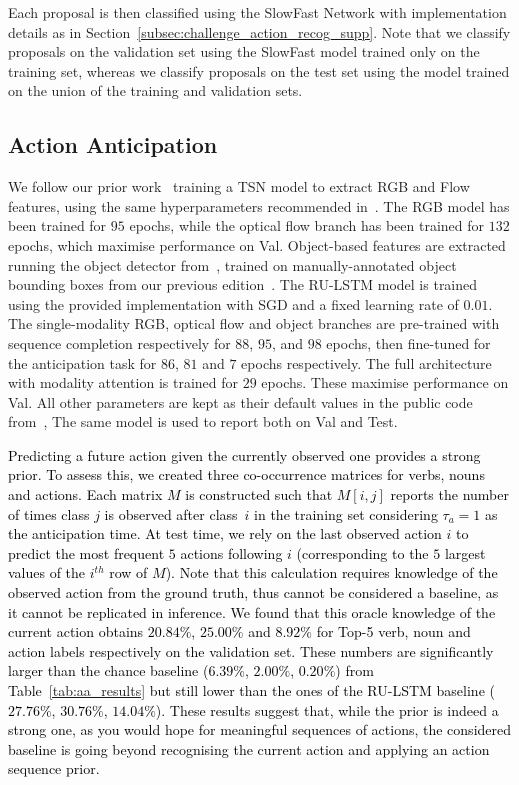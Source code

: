 \documentclass[twocolumn]{svjour3}          \smartqed
\newcommand{\chParagraph}[1]{\noindent {\textbf{#1.}} \hspace{6pt}}
\newcommand{\edits}[1]{\textcolor{black}{#1}}
\begin{document}
Each proposal is then classified using the SlowFast Network with implementation details as in Section~\ref{subsec:challenge_action_recog_supp}. Note that we classify proposals on the validation set using the SlowFast model trained only on the training set, whereas we classify proposals on the test set using the model trained on the union of the training and validation sets.


\subsection{Action Anticipation}


\chParagraph{Implementation and Training Details}
We follow our prior work~\cite{furnari2019would} training a TSN model to extract RGB and Flow features, using the same hyperparameters recommended in~\cite{furnari2019would}.
The RGB model has been trained for $95$ epochs, while the optical flow branch has been trained for $132$ epochs, which maximise performance on Val.
Object-based features are extracted running the object detector from~\cite{furnari2019would}, trained on manually-annotated object bounding boxes from our previous edition~\cite{Damen2018EPICKITCHENS}. 
The RU-LSTM model is trained using the provided implementation with SGD and a fixed learning rate of $0.01$. The single-modality RGB, optical flow and object branches are pre-trained with sequence completion respectively for $88$, $95$, and $98$ epochs, then fine-tuned for the anticipation task for $86$, $81$ and $7$ epochs respectively. The full architecture with modality attention is trained for $29$ epochs. These maximise performance on Val. All other parameters are kept as their default values in the public code from~\cite{furnari2019would}, The same model is used to report both on Val and Test. 

\chParagraph{\edits{Impact of current action on anticipation}}
\edits{Predicting a future action given the currently observed one provides a strong prior. To assess this, we created three co-occurrence matrices for verbs, nouns and actions. Each matrix $M$ is constructed such that $M[i,j]$ reports the number of times class $j$ is observed after class~$i$ in the training set considering $\tau_a=1$ as the anticipation time. At test time, we rely on the last observed action $i$ to predict the most frequent $5$ actions following $i$ (corresponding to the $5$ largest values of the $i^{th}$ row of $M$). 
Note that this calculation requires knowledge of the observed action from the ground truth, thus cannot be considered a baseline, as it cannot be replicated in inference.
We found that this oracle knowledge of the current action
obtains $20.84\%$, $25.00\%$ and $8.92\%$ for Top-5 verb, noun and action labels respectively on the validation set. These numbers are significantly larger than the chance baseline ($6.39\%$, $2.00\%$, $0.20\%$) from Table~\ref{tab:aa_results} but still lower than the ones of the RU-LSTM baseline ($27.76\%$, $30.76\%$, $14.04\%$). These results suggest that, while the prior is indeed a strong one, as you would hope for meaningful sequences of actions, the considered baseline is going beyond recognising the current action and applying an action sequence prior.}
\end{document}

